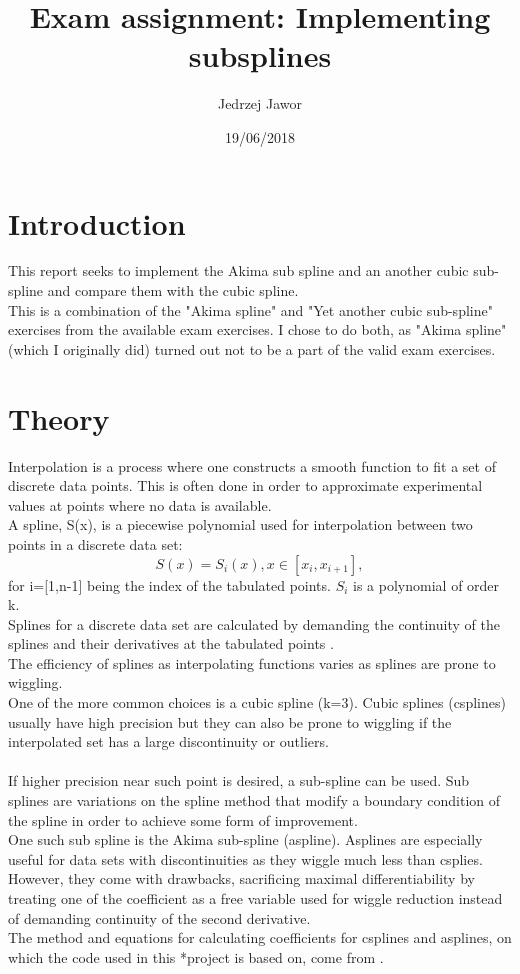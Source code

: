 \documentclass{article}
\begin{document}
\title{Exam assignment: Implementing subsplines}
\author{Jedrzej Jawor}
\date{19/06/2018}
\maketitle

\section{Introduction}
This report seeks to implement the Akima sub spline and an another cubic sub-spline and compare them with the cubic spline.
\\
This is a combination of the "Akima spline" and "Yet another cubic sub-spline" exercises from the available exam exercises.
I chose to do both, as "Akima spline" (which I originally did) turned out not to be a part of the valid exam exercises.

\section{Theory}
Interpolation is a process where one constructs a smooth function to fit a set of discrete data points.
This is often done in order to approximate experimental values at points where no data is available.
\\
A spline, S(x), is a piecewise polynomial used for interpolation between two points in a discrete data set:
\begin{equation}
\label{eq:spline}
S(x)=S_i(x), x \in [x_i,x_{i+1}],
\end{equation}
for i=[1,n-1] being the index of the tabulated points.
$S_i$ is a polynomial of order k.
\\
Splines for a discrete data set are calculated by demanding the continuity of the splines and their 
derivatives at the tabulated points \cite{Prakprog}.
\\
The efficiency of splines as interpolating functions varies as splines are
prone to wiggling.
\\
One of the more common choices is a cubic spline (k=3). Cubic splines (csplines) usually have high precision 
but they can also be prone to wiggling if the interpolated set has a large discontinuity or outliers.
\\
\\
If higher precision near such point is desired, a sub-spline can be used. Sub splines are variations
 on the spline method that modify a boundary condition of the spline in order to achieve some form of improvement.
\\
One such sub spline is the Akima sub-spline (aspline).
Asplines are especially useful for data sets with discontinuities as they wiggle much less 
than csplies. However, they come with drawbacks, sacrificing maximal differentiability by 
treating one of the coefficient as a free variable used for wiggle reduction instead of demanding continuity of 
the second derivative.
\\
The method and equations for calculating coefficients for csplines and asplines, on which the code used in this 
*project is based on, come from \cite{Prakprog}.
\end{document}
